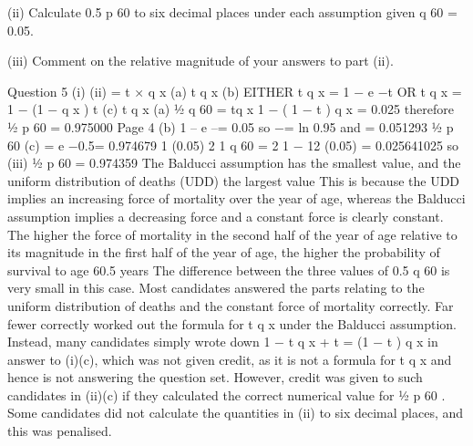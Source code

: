 \documentclass[a4paper,12pt]{article}
\begin{document}

(ii) Calculate 0.5 p 60 to six decimal places under each assumption given q 60 = 0.05.

(iii) Comment on the relative magnitude of your answers to part (ii).



\newpage
Question 5
(i)
(ii)
= t × q x
(a) t q x
(b) EITHER t q x = 1 − e −\mu t OR t q x = 1 − (1 − q x ) t
(c) t q x
(a) 1⁄2 q 60
=
tq x
1 − ( 1 − t ) q x
= 0.025
therefore 1⁄2 p 60 = 0.975000
Page 4 %
(b)
1 – e –\mu = 0.05
so −\mu = ln 0.95 and \mu = 0.051293
1⁄2 p 60
(c)
= e −0.5\mu = 0.974679
1 (0.05)
2
1 q 60 =
2
1 − 12 (0.05)
= 0.025641025
so
(iii)
1⁄2 p 60
= 0.974359
The Balducci assumption has the smallest value, and the uniform distribution of
deaths (UDD) the largest value
This is because the UDD implies an increasing force of mortality over the year of age,
whereas the Balducci assumption implies a decreasing force and a constant force is
clearly constant.
The higher the force of mortality in the second half of the year of age relative to its
magnitude in the first half of the year of age, the higher the probability of survival to
age 60.5 years
The difference between the three values of
0.5
q 60 is very small in this case.
\newpage
Most candidates answered the parts relating to the uniform distribution of deaths and the
constant force of mortality correctly. Far fewer correctly worked out the formula for
t q x under the Balducci assumption. Instead, many candidates simply wrote down
1 − t q x + t = (1 − t ) q x in answer to (i)(c), which was not given credit, as it is not a formula for
t q x and hence is not answering the question set. However, credit was given to such
candidates in (ii)(c) if they calculated the correct numerical value for 1⁄2 p 60 . Some candidates
did not calculate the quantities in (ii) to six decimal places, and this was penalised.
\end{document}
